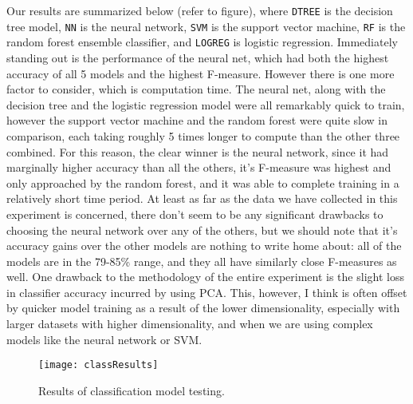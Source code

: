 \documentclass[11pt,oneside,reqno]{amsart}
\theoremstyle{plain}
\theoremstyle{definition}
\theoremstyle{remark}
\newcommand{\inlinecode}{\texttt}
\begin{document}
Our results are summarized below (refer to figure), where \inlinecode{DTREE} is the decision tree model, \inlinecode{NN} is the neural network, \inlinecode{SVM} is the support vector machine, \inlinecode{RF} is the random forest ensemble classifier, and \inlinecode{LOGREG} is logistic regression. Immediately standing out is the performance of the neural net, which had both the highest accuracy of all 5 models and the highest F-measure. However there is one more factor to consider, which is computation time. The neural net, along with the decision tree and the logistic regression model were all remarkably quick to train, however the support vector machine and the random forest were quite slow in comparison, each taking roughly 5 times longer to compute than the other three combined. For this reason, the clear winner is the neural network, since it had marginally higher accuracy than all the others, it's F-measure was highest and only approached by the random forest, and it was able to complete training in a relatively short time period. At least as far as the data we have collected in this experiment is concerned, there don't seem to be any significant drawbacks to choosing the neural network over any of the others, but we should note that it's accuracy gains over the other models are nothing to write home about: all of the models are in the 79-85\% range, and they all have similarly close F-measures as well. One drawback to the methodology of the entire experiment is the slight loss in classifier accuracy incurred by using PCA. This, however, I think is often offset by quicker model training as a result of the lower dimensionality, especially with larger datasets with higher dimensionality, and when we are using complex models like the neural network or SVM. 



\begin{figure}[H]
\begin{adjustbox}{center}
\texttt{[image: classResults]}
\end{adjustbox}
\caption{Results of classification model testing. }
\end{figure}
\end{document}
